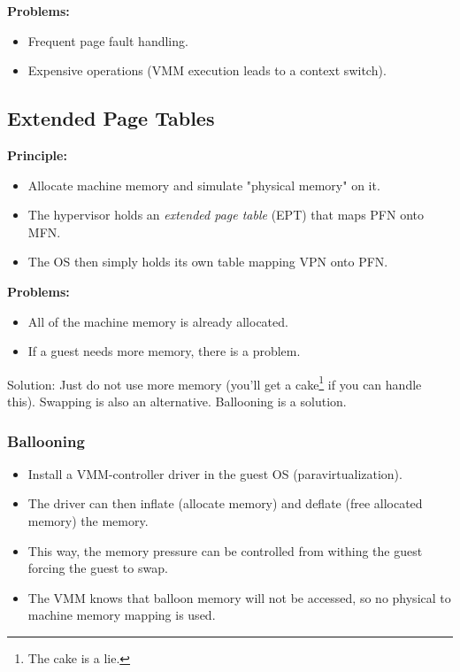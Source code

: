             \textbf{Problems:}
	        \begin{itemize}
	        	\item Frequent page fault handling.
	        	\item Expensive operations (VMM execution leads to a context switch).
	        \end{itemize}

        \subsection{Extended Page Tables}
            \textbf{Principle:}
            \begin{itemize}
            	\item Allocate machine memory and simulate "physical memory" on it.
            	\item The hypervisor holds an \textit{extended page table} (EPT) that maps PFN onto MFN.
            	\item The OS then simply holds its own table mapping VPN onto PFN.
            \end{itemize}
        
            \textbf{Problems:}
            \begin{itemize}
            	\item All of the machine memory is already allocated.
            	\item If a guest needs more memory, there is a problem.
            \end{itemize}
        
            Solution: Just do not use more memory (you'll get a cake\footnote{The cake is a lie.} if you can handle this). Swapping is also an alternative. Ballooning is a solution.
            
            \subsubsection{Ballooning}
	            \begin{itemize}
	            	\item Install a VMM-controller driver in the guest OS (paravirtualization).
	            	\item The driver can then inflate (allocate memory) and deflate (free allocated memory) the memory.
	            	\item This way, the memory pressure can be controlled from withing the guest forcing the guest to swap.
	            	\item The VMM knows that balloon memory will not be accessed, so no physical to machine memory mapping is used.
	            \end{itemize}

